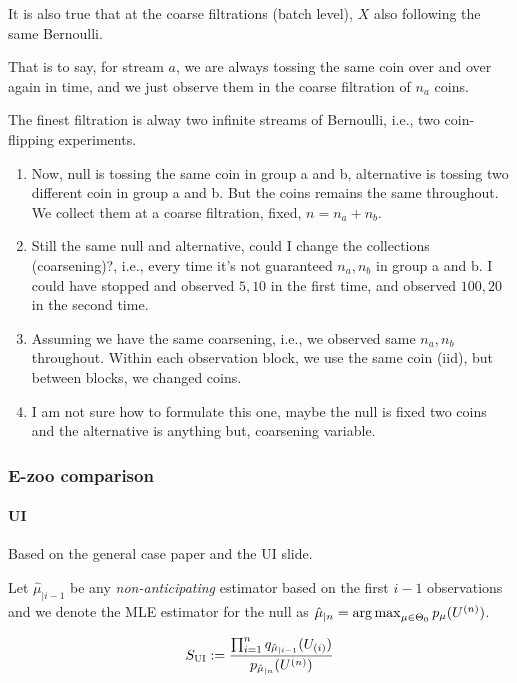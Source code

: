 It is also true that at the coarse filtrations (batch level),
$X$ also following the same Bernoulli.

That is to say, for stream $a$, 
we are always tossing the same coin over and over again in time,
and we just observe them in the coarse filtration of $n_a$ coins.

The finest filtration is alway two infinite streams of Bernoulli,
i.e., two coin-flipping experiments.

\begin{enumerate}
	\item Now, null is tossing the same coin in group a and b,
	alternative is tossing two different coin in group a and b.
	But the coins remains the same throughout.
	We collect them at a coarse filtration, fixed, $n=n_a+n_b$.
	\item Still the same null and alternative,
	could I change the collections (coarsening)?,
	i.e., every time it's not guaranteed $n_a,n_b$ in group a and b.
	I could have stopped and observed $5,10$ in the first time,
	and observed $100, 20$ in the second time.
	\item Assuming we have the same coarsening,
	i.e., we observed same $n_a,n_b$ throughout.
	Within each observation block, we use the same coin (iid),
	but between blocks, we changed coins.
	\item I am not sure how to formulate this one,
	maybe the null is fixed two coins and the alternative is anything but,
	coarsening variable.
\end{enumerate}

\newpage

\subsubsection{E-zoo comparison}

\paragraph{UI}

Based on the general case paper and the UI slide.

Let $\hat{\mu}_{\mid i-1}$ be any \emph{non-anticipating}
estimator based on the first $i-1$ observations and we
denote the MLE estimator for the null as
$\hat{\mu}_{\mid n} = \operatorname*{arg\, max}_{\mu\in\Theta_0} p_{\mu}(U^{{(n)}})$.

\begin{align*}
	S_{\textsc{UI}} := \frac{\prod_{i=1}^n q_{\hat{\mu}_{\mid i-1}} (U_{(i)})}{p_{\hat{\mu}_{\mid n}}(U^{(n)})}
\end{align*}

